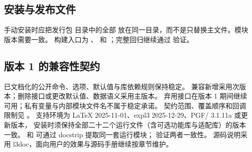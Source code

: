 \subsection{安装与发布文件}
手动安装时应把发行包  目录中的全部 
放在同一目录，而不是只替换主文件。模块版本需要一致。
构建入口为 、 和 ；完整回归继续通过
 验证。
\subsection{版本 1 的兼容性契约}
已文档化的公开命令、选项、默认值与库依赖规则保持稳定。
兼容新增采用次版本；删除接口或更改默认值、数据语义采用主版本。
弃用接口在版本 1 期间继续可用；私有变量与内部模块文件名不属于稳定承诺。
契约范围、覆盖顺序和回调限制见 。
支持环境为 LaTeX 2025-11-01、expl3 2025-12-29、PGF/\manualTikZ{} 3.1.11a 或更新版本，
安装时须保持全部二十二个运行文件（含可选功能库与适配库）的版本一致。
 和  可通过 docstrip 提取同一套运行模块；
 验证两者一致性。
源码说明采用 l3doc，面向用户的效果与源码手册继续按章节维护。
